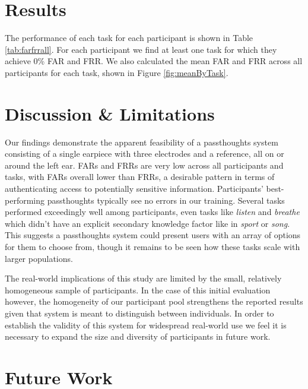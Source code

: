\documentclass{sigchi-ext}
\begin{document}
\section{Results}
The performance of each task for each participant is shown in Table \ref{tab:farfrrall}. For each participant we find at least one task for which they achieve 0\% FAR and FRR. We also calculated the mean FAR and FRR across all participants for each task, shown in Figure \ref{fig:meanByTask}.

\section{Discussion \& Limitations}
Our findings demonstrate the apparent feasibility of a passthoughts system consisting of a single earpiece with three electrodes and a reference, all on or around the left ear. FARs and FRRs are very low across all participants and tasks, with FARs overall lower than FRRs, a desirable pattern in terms of authenticating access to potentially sensitive information. Participants' best-performing passthoughts typically see no errors in our training. Several tasks performed exceedingly well among participants, even tasks like \textit{listen} and \textit{breathe} which didn't have an explicit secondary knowledge factor like in \textit{sport} or \textit{song}. This suggests a passthoughts system could present users with an array of options for them to choose from, though it remains to be seen how these tasks scale with larger populations.

The real-world implications of this study are limited by the small, relatively homogeneous sample of participants. In the case of this initial evaluation however, the homogeneity of our participant pool strengthens the reported results given that system is meant to distinguish between individuals. In order to establish the validity of this system for widespread real-world use we feel it is necessary to expand the size and diversity of participants in future work.

\section{Future Work}

\end{document}
